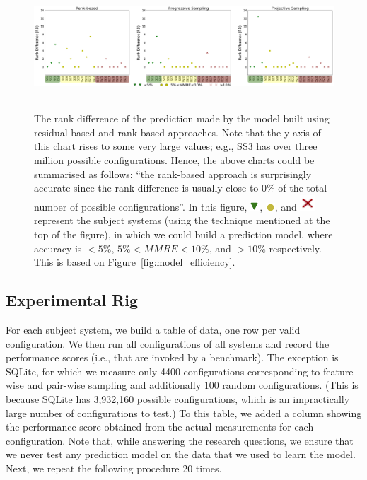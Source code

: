 \documentclass[sigconf]{acmart}
\newcommand{\custriangle}{\includegraphics[scale=0.5]{Figures/upsidedown.png}}
\newcommand{\cuscross}{\includegraphics[scale=0.4]{Figures/cross.png}}
\newcommand{\cusdot}{\includegraphics[scale=0.5]{Figures/dot.png}}
\begin{document}
\begin{figure}[tbh]
\centering
\includegraphics[width=0.8\paperwidth, height=4.7cm]{Figures/figure4_2_mod}
\caption{
    \small{The rank difference of the prediction made by the model built using residual-based and rank-based approaches. Note that the y-axis of this chart rises to some very large values; e.g., SS3 has over three million
    possible configurations. Hence, the above charts could be summarised as follows: ``the rank-based approach is surprisingly accurate since the rank difference is usually close to 0\% of the total number of possible configurations''. In this figure, \protect\custriangle{}, \protect\cusdot{}, and \protect\cuscross{} represent the subject systems (using the technique mentioned at the top of the figure), in which we could build a prediction model, where accuracy is  $< 5\%$, $5\%<MMRE<10\%$, and $>10\%$ respectively. This is based on Figure~\ref{fig:model_efficiency}.
    }
}\label{fig:rankdiff}
\end{figure}



\subsection{Experimental Rig}
For each subject system, we build a table of data, one row per valid configuration. We then run all configurations of all systems and record the performance scores (i.e., that are invoked by a benchmark). The exception is SQLite, for which we measure only 4400 configurations corresponding to feature-wise and pair-wise sampling and additionally 100 random configurations. (This is because SQLite has 3,932,160 possible configurations,
which is an impractically large number of configurations to test.) To this table, we added a column showing the performance score obtained from the actual measurements for each configuration. Note that, while answering the research questions, we ensure that we never test any prediction model on the data that we used to learn the model. Next, we repeat the following procedure 20 times. 
\end{document}
